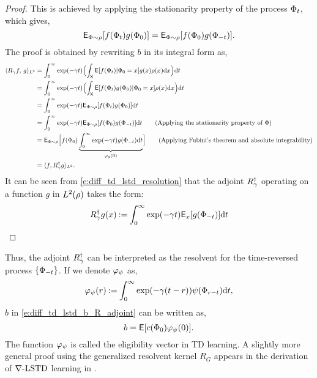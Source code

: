 \begin{proof}
 This is achieved by applying the stationarity property of the process $\Phi_t$, which gives, 
\begin{equation}
{\sf E}_{\Phi \sim \rho}[f(\Phi_t) g(\Phi_0)] = {\sf E}_{\Phi \sim \rho} [f(\Phi_0) g(\Phi_{-t})].
\end{equation} 
The proof is obtained by rewriting $b$ in its integral form as,
\begin{equation}
\begin{aligned}
\langle R_\discount f, \, g \rangle_{L^2} 
& = \int_0^\infty \exp(-\discount t)  \Bigl(\int_{\state} \Expect[f(\markovstate_t)| \markovstate_0 = x] g(x)  \pr(x) \ud x \Bigr) \ud t \\
& = \int_0^\infty \exp(-\discount t)  \Bigl(\int_{\state} \Expect[f(\markovstate_t) g(\markovstate_0)| \markovstate_0 = x]  \pr(x) \ud x \Bigr) \ud t \\
& = \int_0^\infty \exp(-\discount t) \Expect_{\markovstate \sim \pr}[f(\markovstate_t) g(\markovstate_0)]\ud t \\
& = \int_0^\infty \exp(-\discount t) \Expect_{\markovstate \sim \pr}[f(\markovstate_0) g(\markovstate_{-t})] \ud t \qquad \text{(Applying the stationarity property of $\markovstate$)}\\
& = \Expect_{\markovstate \sim \pr}\Bigl[f(\markovstate_0) \underbrace{\int_0^\infty \exp(-\discount t) g(\markovstate_{-t})\ud t}_{\eligibvector_g(0)}\Bigr]  \qquad \text{(Applying Fubini's theorem and absolute integrability)}\\
& = \langle f, R^\dagger_\discount g\rangle_{L^2}.
\label{e:diff_td_lstd_resolution}
\end{aligned}
\end{equation}
It can be seen from \eqref{e:diff_td_lstd_resolution} that the adjoint $R^\dagger_\gamma$ operating on a function $g$ in $L^2(\rho)$ takes the form:
\begin{equation}
R^\dagger_\discount g(x) \eqdef \int_0^\infty \exp(-\discount t ) \Expect_x[g(\markovstate_{-t})] \ud t %
\end{equation}
\end{proof}
Thus, the adjoint $R^\dagger_\gamma$ can be interpreted as the resolvent for the time-reversed process $\{\Phi_{-t}\}$. 
If we denote $\varphi_\psi$ as,
\begin{equation}
\eligibvector_\basis(r) \eqdef \int_0^\infty \exp(-\discount (t -r)) \basis(\markovstate_{r-t}) \ud t,
\label{e:diff_td_lstd_eligib}
\end{equation}
$b$ in \eqref{e:diff_td_lstd_b_R_adjoint} can be written as,
\begin{equation}
b = \Expect[c(\markovstate_0) \eligibvector_\basis(0)].
\label{e:diff_td_lstd_b}
\end{equation}
The function $\varphi_\psi$ is called the eligibility vector in TD learning. A slightly more general proof using the generalized resolvent kernel $R_G$ appears in the derivation of $\nabla\text{-LSTD}$ learning in .

